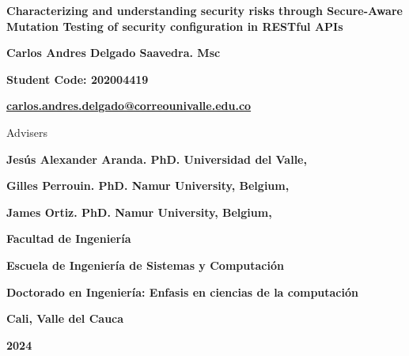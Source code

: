 
\begin{titlepage}
\begin{comment}

		\begin{center}
			{\bf Characterizing and understanding security risks through Secure-Aware Mutation Testing of security configuration in RESTful-APIs}
			\vfill
			{\bf Carlos Andres Delgado Saavedra. Msc \par}
			{\bf Código: 2004419 \par}
			{\bf carlos.andres.delgado@correounivalle.edu.co }
			\vfill
			{\bf Facultad de Ingeniería \par}
			{\bf Escuela de Ingeniería de Sistemas y Computación \par}
			{\bf Doctorado en Ingeniería: Enfasis en ciencias de la computación\par}
			{\bf Cali, Valle del Cauca \par}
			{\bf 2024 \par}
    \end{center}
\newpage
\end{comment}
	\begin{center}
			{\bf Characterizing and understanding security risks through Secure-Aware Mutation Testing of security configuration in RESTful APIs}
			\vfill
			{\bf Carlos Andres Delgado Saavedra. Msc \par}
			{\bf Student Code: 202004419 \par}
			{\bf \href{mailto:carlos.andres.delgado@correounivalle.edu.co}{carlos.andres.delgado@correounivalle.edu.co }}
			\vfill

		{Advisers \par}
		{\bf Jesús Alexander Aranda. PhD. Universidad del Valle, \par}
		{\bf Gilles Perrouin. PhD. Namur University, Belgium, \par}
    {\bf James Ortiz. PhD. Namur University, Belgium, \par}
			\vfill 
			{\bf Facultad de Ingeniería \par}
			{\bf Escuela de Ingeniería de Sistemas y Computación \par}
			{\bf Doctorado en Ingeniería: Enfasis en ciencias de la computación\par}
			{\bf Cali, Valle del Cauca \par}
			{\bf 2024 \par}
    \end{center}
\end{titlepage} 
